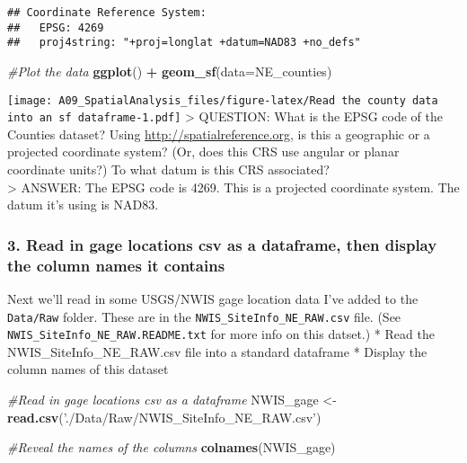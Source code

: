 \documentclass[]{article}
\newenvironment{Shaded}{\begin{snugshade}}{\end{snugshade}}
\newcommand{\KeywordTok}[1]{\textcolor[rgb]{0.13,0.29,0.53}{\textbf{#1}}}
\newcommand{\DataTypeTok}[1]{\textcolor[rgb]{0.13,0.29,0.53}{#1}}
\newcommand{\StringTok}[1]{\textcolor[rgb]{0.31,0.60,0.02}{#1}}
\newcommand{\CommentTok}[1]{\textcolor[rgb]{0.56,0.35,0.01}{\textit{#1}}}
\newcommand{\OperatorTok}[1]{\textcolor[rgb]{0.81,0.36,0.00}{\textbf{#1}}}
\newcommand{\NormalTok}[1]{#1}
\begin{document}
\begin{verbatim}
## Coordinate Reference System:
##   EPSG: 4269 
##   proj4string: "+proj=longlat +datum=NAD83 +no_defs"
\end{verbatim}

\begin{Shaded}
\begin{Highlighting}[]
\CommentTok{#Plot the data}
\KeywordTok{ggplot}\NormalTok{() }\OperatorTok{+}\StringTok{ }
\StringTok{  }\KeywordTok{geom_sf}\NormalTok{(}\DataTypeTok{data=}\NormalTok{NE_counties)}
\end{Highlighting}
\end{Shaded}

\texttt{[image: A09\_SpatialAnalysis\_files/figure-latex/Read the county data into an sf dataframe-1.pdf]}
\textgreater{} QUESTION: What is the EPSG code of the Counties dataset?
Using \url{http://spatialreference.org}, is this a geographic or a
projected coordinate system? (Or, does this CRS use angular or planar
coordinate units?) To what datum is this CRS associated?\\
\textgreater{} ANSWER: The EPSG code is 4269. This is a projected
coordinate system. The datum it's using is NAD83.

\subsubsection{3. Read in gage locations csv as a dataframe, then
display the column names it
contains}\label{read-in-gage-locations-csv-as-a-dataframe-then-display-the-column-names-it-contains}

Next we'll read in some USGS/NWIS gage location data I've added to the
\texttt{Data/Raw} folder. These are in the
\texttt{NWIS\_SiteInfo\_NE\_RAW.csv} file. (See
\texttt{NWIS\_SiteInfo\_NE\_RAW.README.txt} for more info on this
datset.) * Read the NWIS\_SiteInfo\_NE\_RAW.csv file into a standard
dataframe * Display the column names of this dataset

\begin{Shaded}
\begin{Highlighting}[]
\CommentTok{#Read in gage locations csv as a dataframe}
\NormalTok{NWIS_gage <-}\StringTok{ }\KeywordTok{read.csv}\NormalTok{(}\StringTok{'./Data/Raw/NWIS_SiteInfo_NE_RAW.csv'}\NormalTok{)}

\CommentTok{#Reveal the names of the columns}
\KeywordTok{colnames}\NormalTok{(NWIS_gage)}
\end{Highlighting}
\end{Shaded}
\end{document}
